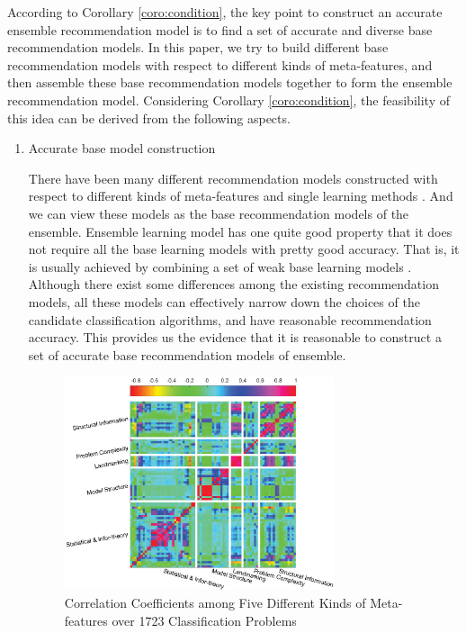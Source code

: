 \documentclass[acmsmall]{acmart}
\begin{document}
According to Corollary \ref{coro:condition}, the key point to
construct an accurate ensemble recommendation model is to find a set
of accurate and diverse base recommendation models. In this paper,
we try to build different base recommendation models with respect to
different kinds of meta-features, and then assemble these base
recommendation models together to form the ensemble recommendation
model. Considering Corollary \ref{coro:condition}, the feasibility
of this idea can be derived from the following aspects.
\begin{enumerate}
	\item Accurate base model construction
	
	\quad There have been many different recommendation models constructed
	with respect to different kinds of meta-features and single
	learning methods \cite{brazdil2003ranking,Bensusan1998god,peng2002improved,Pfahringer00meta,Bensusan2000casa,jain2000statistical,duin2004characterization,ho2002complexity,song2012automatic}. And we can view these
	models as the base recommendation models of the ensemble. Ensemble learning model has
	one quite good property that it does not require all the base learning models
	with pretty good accuracy. That is, it is usually achieved by combining a
	set of weak base learning models \cite{dietterichl2002ensemble}. Although there exist some differences among
	the existing recommendation models, all these models can effectively narrow down the choices of the
	candidate classification algorithms, and have reasonable
	recommendation accuracy. This provides us the evidence that it is reasonable to
	construct a set of accurate base recommendation models of ensemble.
	
	\begin{figure}
		\centering
		\includegraphics[width=0.75\textwidth]{Figures/CorrelationBetweenMetaFeatures}
		\caption{Correlation Coefficients among Five Different Kinds of Meta-features over 1723 Classification Problems}\label{Fig:CorrelationAmongMetaFeatures}
	\end{figure}
	

\end{enumerate}
\end{document}
